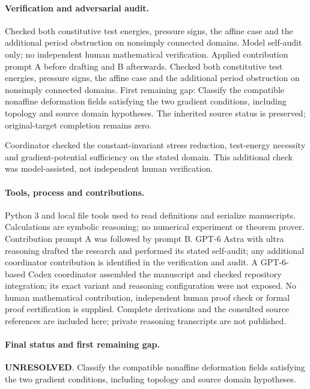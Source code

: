 \documentclass[11pt]{article}
\begin{document}
\paragraph{Verification and adversarial audit.}
Checked both constitutive test energies, pressure signs, the affine case and the additional period obstruction on nonsimply connected domains. Model self-audit only; no independent human mathematical verification. Applied contribution prompt A before drafting and B afterwards. Checked both constitutive test energies, pressure signs, the affine case and the additional period obstruction on nonsimply connected domains. First remaining gap: Classify the compatible nonaffine deformation fields satisfying the two gradient conditions, including topology and source domain hypotheses. The inherited source status is preserved; original-target completion remains zero.

Coordinator checked the constant-invariant stress reduction, test-energy necessity and gradient-potential sufficiency on the stated domain. This additional check was model-assisted, not independent human verification.

\paragraph{Tools, process and contributions.}
Python 3 and local file tools used to read definitions and serialize manuscripts. Calculations are symbolic reasoning; no numerical experiment or theorem prover. Contribution prompt A was followed by prompt B. GPT-6 Astra with ultra reasoning drafted the research and performed its stated self-audit; any additional coordinator contribution is identified in the verification and audit. A GPT-6-based Codex coordinator assembled the manuscript and checked repository integration; its exact variant and reasoning configuration were not exposed. No human mathematical contribution, independent human proof check or formal proof certification is supplied. Complete derivations and the consulted source references are included here; private reasoning transcripts are not published.

\paragraph{Final status and first remaining gap.}
\textbf{UNRESOLVED}. Classify the compatible nonaffine deformation fields satisfying the two gradient conditions, including topology and source domain hypotheses.
\end{document}
